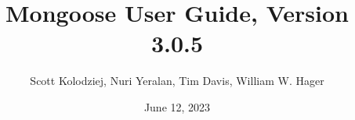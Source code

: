 \title{Mongoose User Guide, Version 3.0.5}
\author{Scott Kolodziej, Nuri Yeralan, Tim Davis, William W. Hager}
\date{June 12, 2023}
